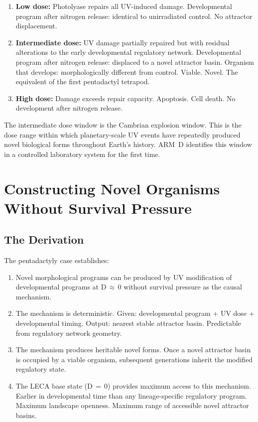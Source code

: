 \documentclass[11pt, a4paper]{article}
\begin{document}
\begin{enumerate}[leftmargin=*, label=(\arabic*)]
\item \textbf{Low dose:} Photolyase repairs all
  UV-induced damage. Developmental program after
  nitrogen release: identical to unirradiated
  control. No attractor displacement.

\item \textbf{Intermediate dose:} UV damage
  partially repaired but with residual alterations
  to the early developmental regulatory network.
  Developmental program after nitrogen release:
  displaced to a novel attractor basin.
  Organism that develops: morphologically different
  from control. Viable. Novel. The equivalent of
  the first pentadactyl tetrapod.

\item \textbf{High dose:} Damage exceeds repair
  capacity. Apoptosis. Cell death. No development
  after nitrogen release.
\end{enumerate}

The intermediate dose window is the Cambrian
explosion window.
This is the dose range within which planetary-scale
UV events have repeatedly produced novel biological
forms throughout Earth's history.
ARM~D identifies this window in a controlled
laboratory system for the first time.

\section{Constructing Novel Organisms Without
Survival Pressure}

\subsection{The Derivation}

The pentadactyly case establishes:

\begin{enumerate}[leftmargin=*, label=(\arabic*)]
\item Novel morphological programs can be produced
  by UV modification of developmental programs at
  D\,$\approx$\,0 without survival pressure as the
  causal mechanism.

\item The mechanism is deterministic.
  Given: developmental program + UV dose +
  developmental timing.
  Output: nearest stable attractor basin.
  Predictable from regulatory network geometry.

\item The mechanism produces heritable novel forms.
  Once a novel attractor basin is occupied by a
  viable organism, subsequent generations inherit
  the modified regulatory state.

\item The LECA base state (D\,$=$\,0) provides
  maximum access to this mechanism.
  Earlier in developmental time than any
  lineage-specific regulatory program.
  Maximum landscape openness.
  Maximum range of accessible novel attractor basins.
\end{enumerate}
\end{document}
